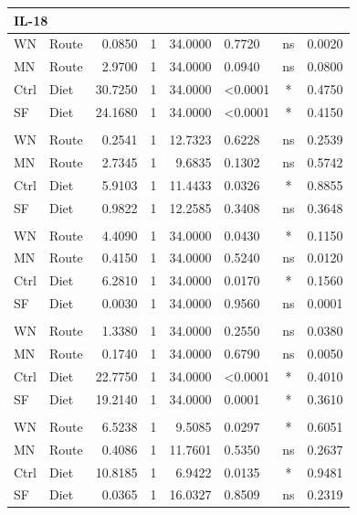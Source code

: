\documentclass[
  12pt,
  letterpaper,
]{article}
\begin{document}
\begin{longtable}{l|lrrrlcr}
\multicolumn{8}{l}{IL-18} \\[2.5pt] 
\midrule\addlinespace[2.5pt]
WN & Route & 0.0850 & 1 & 34.0000 & 0.7720 & ns & 0.0020 \\ 
MN & Route & 2.9700 & 1 & 34.0000 & 0.0940 & ns & 0.0800 \\ 
Ctrl & Diet & 30.7250 & 1 & 34.0000 & <0.0001 & * & 0.4750 \\ 
SF & Diet & 24.1680 & 1 & 34.0000 & <0.0001 & * & 0.4150 \\ 
\midrule\addlinespace[2.5pt]
\multicolumn{8}{l}{IL-2} \\[2.5pt] 
\midrule\addlinespace[2.5pt]
WN & Route & 0.2541 & 1 & 12.7323 & 0.6228 & ns & 0.2539 \\ 
MN & Route & 2.7345 & 1 & 9.6835 & 0.1302 & ns & 0.5742 \\ 
Ctrl & Diet & 5.9103 & 1 & 11.4433 & 0.0326 & * & 0.8855 \\ 
SF & Diet & 0.9822 & 1 & 12.2585 & 0.3408 & ns & 0.3648 \\ 
\midrule\addlinespace[2.5pt]
\multicolumn{8}{l}{IL-22} \\[2.5pt] 
\midrule\addlinespace[2.5pt]
WN & Route & 4.4090 & 1 & 34.0000 & 0.0430 & * & 0.1150 \\ 
MN & Route & 0.4150 & 1 & 34.0000 & 0.5240 & ns & 0.0120 \\ 
Ctrl & Diet & 6.2810 & 1 & 34.0000 & 0.0170 & * & 0.1560 \\ 
SF & Diet & 0.0030 & 1 & 34.0000 & 0.9560 & ns & 0.0001 \\ 
\midrule\addlinespace[2.5pt]
\multicolumn{8}{l}{IL-4} \\[2.5pt] 
\midrule\addlinespace[2.5pt]
WN & Route & 1.3380 & 1 & 34.0000 & 0.2550 & ns & 0.0380 \\ 
MN & Route & 0.1740 & 1 & 34.0000 & 0.6790 & ns & 0.0050 \\ 
Ctrl & Diet & 22.7750 & 1 & 34.0000 & <0.0001 & * & 0.4010 \\ 
SF & Diet & 19.2140 & 1 & 34.0000 & 0.0001 & * & 0.3610 \\ 
\midrule\addlinespace[2.5pt]
\multicolumn{8}{l}{IL-5} \\[2.5pt] 
\midrule\addlinespace[2.5pt]
WN & Route & 6.5238 & 1 & 9.5085 & 0.0297 & * & 0.6051 \\ 
MN & Route & 0.4086 & 1 & 11.7601 & 0.5350 & ns & 0.2637 \\ 
Ctrl & Diet & 10.8185 & 1 & 6.9422 & 0.0135 & * & 0.9481 \\ 
SF & Diet & 0.0365 & 1 & 16.0327 & 0.8509 & ns & 0.2319 \\ 

\end{longtable}
\end{document}
